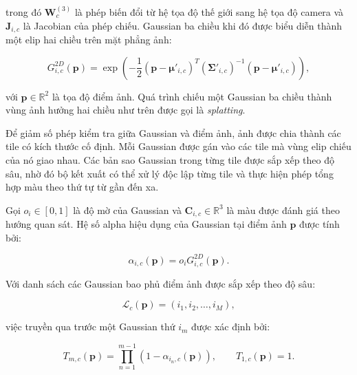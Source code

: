 trong đó $\mathbf{W}^{(3)}_c$ là phép biến đổi từ hệ tọa độ thế giới sang hệ tọa độ camera và $\mathbf{J}_{i,c}$ là Jacobian của phép chiếu. Gaussian ba chiều khi đó được biểu diễn thành một elip hai chiều trên mặt phẳng ảnh:

\begin{equation}
    G^{2D}_{i,c}(\mathbf{p})
    =
    \exp
    \left(
        -\frac{1}{2}
        \left(
            \mathbf{p}-\boldsymbol{\mu}'_{i,c}
        \right)^{T}
        \left(
            \boldsymbol{\Sigma}'_{i,c}
        \right)^{-1}
        \left(
            \mathbf{p}-\boldsymbol{\mu}'_{i,c}
        \right)
    \right),
    \label{eq:3dgs-projected-gaussian}
\end{equation}

với $\mathbf{p}\in\mathbb{R}^{2}$ là tọa độ điểm ảnh. Quá trình chiếu một Gaussian ba chiều thành vùng ảnh hưởng hai chiều như trên được gọi là \emph{splatting}.

Để giảm số phép kiểm tra giữa Gaussian và điểm ảnh, ảnh được chia thành các tile có kích thước cố định. Mỗi Gaussian được gán vào các tile mà vùng elip chiếu của nó giao nhau. Các bản sao Gaussian trong từng tile được sắp xếp theo độ sâu, nhờ đó bộ kết xuất có thể xử lý độc lập từng tile và thực hiện phép tổng hợp màu theo thứ tự từ gần đến xa.

Gọi $o_i\in[0,1]$ là độ mờ của Gaussian và $\mathbf{C}_{i,c}\in\mathbb{R}^{3}$ là màu được đánh giá theo hướng quan sát. Hệ số alpha hiệu dụng của Gaussian tại điểm ảnh $\mathbf{p}$ được tính bởi:

\begin{equation}
    \alpha_{i,c}(\mathbf{p})
    =
    o_i
    G^{2D}_{i,c}(\mathbf{p}).
    \label{eq:3dgs-effective-alpha}
\end{equation}

Với danh sách các Gaussian bao phủ điểm ảnh được sắp xếp theo độ sâu:

\begin{equation}
    \mathcal{L}_c(\mathbf{p})
    =
    \left(
        i_1,i_2,\ldots,i_M
    \right),
\end{equation}

việc truyền qua trước một Gaussian thứ $i_m$ được xác định bởi:

\begin{equation}
    T_{m,c}(\mathbf{p})
    =
    \prod_{n=1}^{m-1}
    \left(
        1-\alpha_{i_n,c}(\mathbf{p})
    \right),
    \qquad
    T_{1,c}(\mathbf{p})=1.
    \label{eq:3dgs-transmittance}
\end{equation}

